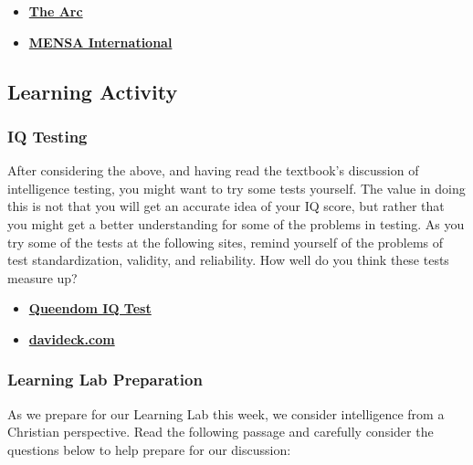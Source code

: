 \documentclass[
]{book}
\providecommand{\tightlist}{%
  \setlength{\itemsep}{0pt}\setlength{\parskip}{0pt}}
\begin{document}
\begin{itemize}
\item
  \href{https://thearc.org/}{\textbf{The Arc}}
\item
  \href{https://www.mensa.org}{\textbf{MENSA International}}
\end{itemize}

\hypertarget{learning-activity-3}{%
\subsection*{Learning Activity}\label{learning-activity-3}}

\begin{reflect}
\hypertarget{iq-testing-1}{%
\subsubsection*{IQ Testing}\label{iq-testing-1}}

After considering the above, and having read the textbook's discussion of intelligence testing, you might want to try some tests yourself. The value in doing this is not that you will get an accurate idea of your IQ score, but rather that you might get a better understanding for some of the problems in testing. As you try some of the tests at the following sites, remind yourself of the problems of test standardization, validity, and reliability. How well do you think these tests measure up?

\begin{itemize}
\tightlist
\item
  \href{https://www.queendom.com/tests/index.htm}{\textbf{Queendom IQ Test}}\\
\item
  \href{http://www.davideck.com/}{\textbf{davideck.com}}
\end{itemize}

\hypertarget{learning-lab-preparation-5}{%
\subsubsection*{Learning Lab Preparation}\label{learning-lab-preparation-5}}

As we prepare for our Learning Lab this week, we consider intelligence from a Christian perspective. Read the following passage and carefully consider the questions below to help prepare for our discussion:


\end{reflect}
\end{document}
